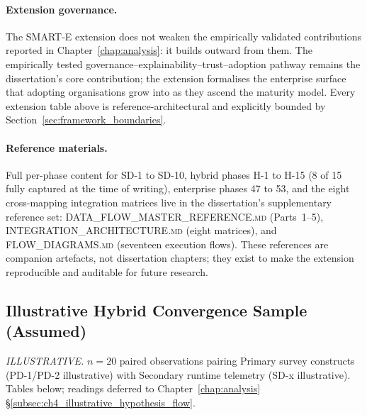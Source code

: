 \paragraph{Extension governance.} The SMART-E extension does not weaken the empirically validated contributions reported in Chapter~\ref{chap:analysis}: it builds outward from them. The empirically tested governance--explainability--trust--adoption pathway remains the dissertation's core contribution; the extension formalises the enterprise surface that adopting organisations grow into as they ascend the maturity model. Every extension table above is reference-architectural and explicitly bounded by Section~\ref{sec:framework_boundaries}.

\paragraph{Reference materials.} Full per-phase content for SD-1 to SD-10, hybrid phases H-1 to H-15 (8 of 15 fully captured at the time of writing), enterprise phases 47 to 53, and the eight cross-mapping integration matrices live in the dissertation's supplementary reference set: \textsc{DATA\_FLOW\_MASTER\_REFERENCE.md} (Parts~1--5), \textsc{INTEGRATION\_ARCHITECTURE.md} (eight matrices), and \textsc{FLOW\_DIAGRAMS.md} (seventeen execution flows). These references are companion artefacts, not dissertation chapters; they exist to make the extension reproducible and auditable for future research.

\subsection{Illustrative Hybrid Convergence Sample (Assumed)}
\label{subsec:ch5_illustrative_hybrid}

\noindent\emph{ILLUSTRATIVE.} $n{=}20$ paired observations pairing Primary survey constructs (PD-1/PD-2 illustrative) with Secondary runtime telemetry (SD-x illustrative). Tables below; readings deferred to Chapter~\ref{chap:analysis} §\ref{subsec:ch4_illustrative_hypothesis_flow}.

